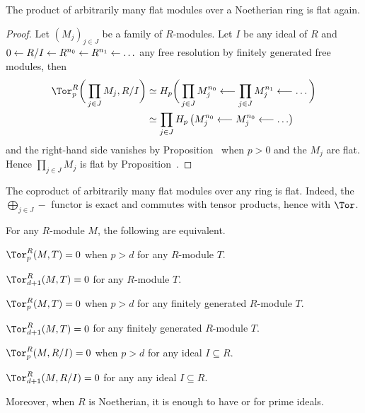 \documentclass[a4paper,parskip=half,numbers=enddot, DIV=12]{scrreprt}
\begin{document}
\begin{example}
	The product of arbitrarily many flat modules over a Noetherian ring is flat again.
\end{example}
\begin{proof}
	Let $(M_j)_{j\in J}$ be a family of $R$-modules. Let $I$ be any ideal of $R$ and $0\lmorphism R/I\lmorphism R^{n_0}\lmorphism R^{n_1}\lmorphism\ldots$ any free resolution by finitely generated free modules, then
	\begin{align*}
		\Tor_p^R\bigg(\prod_{j\in J}M_j,R/I\bigg)&\simeq H_p\bigg(\prod_{j\in J}M_j^{n_0}\lmorphism\prod_{j\in J}M_j^{n_1}\lmorphism\ldots \bigg)\\
		&\simeq \prod_{j\in J} H_p\left(M_j^{n_0}\lmorphism M_j^{n_0}\lmorphism\ldots\right)
	\end{align*}
	and the right-hand side vanishes by Proposition~ when $p>0$ and the $M_j$ are flat. Hence $\prod_{j\in J}M_j$ is flat by Proposition~.
\end{proof}
\begin{example}
	The coproduct of arbitrarily many flat modules over any ring is flat. Indeed, the $\bigoplus_{j\in J}-$ functor is exact and commutes with tensor products, hence with $\Tor$.
\end{example}
\begin{fact}
	For any $R$-module $M$, the following are equivalent.
	\begin{alphanumerate}
		\item $\Tor_p^R(M,T)=0$ when $p>d$ for any $R$-module $T$.
		\item $\Tor_{d+1}^R(M,T)=0$ for any $R$-module $T$.
		\item $\Tor_p^R(M,T)=0$ when $p>d$ for any finitely generated $R$-module $T$.
		\item $\Tor_{d+1}^R(M,T)=0$ for any finitely generated $R$-module $T$.		
		\item $\Tor_p^R(M,R/I)=0$ when $p>d$ for any ideal $I\subseteq R$.
		\item $\Tor_{d+1}^R(M,R/I)=0$ for any any ideal $I\subseteq R$.
	\end{alphanumerate}
	Moreover, when $R$ is Noetherian, it is enough to have  or  for prime ideals.
\end{fact}
\end{document}
